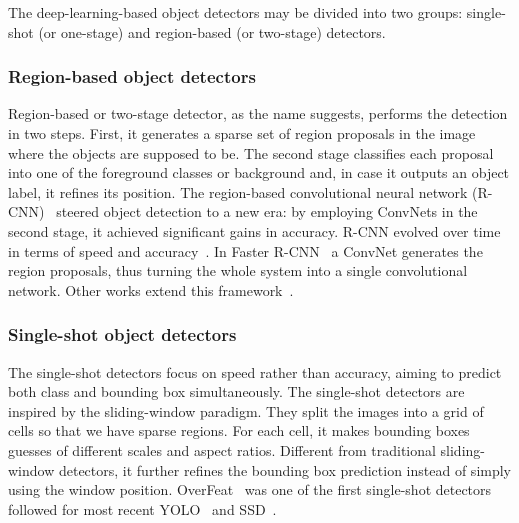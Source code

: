 %
The deep-learning-based object detectors may be divided into two groups: single-shot (or one-stage) and region-based (or two-stage) detectors.

\subsubsection{Region-based object detectors}
%
Region-based or two-stage detector, as the name suggests, performs the detection in two steps.
First, it generates a sparse set of region proposals in the image where the objects are supposed to be.
The second stage classifies each proposal into one of the foreground classes or background and, in case it outputs an object label, it refines its position.
The region-based convolutional neural network (R-CNN)~\cite{Girshick2016RCNN}
steered object detection to a new era:
by employing ConvNets in the second stage, it achieved significant gains in accuracy.
R-CNN evolved over time in terms of speed and accuracy~\cite{Girshick2015, Ren2017fasterpami}.
In Faster R-CNN~\cite{Ren2017fasterpami} a ConvNet generates the region proposals, thus turning the whole system into a single convolutional network.
Other works extend this framework~\cite{Dai2016, He2017mask}.

\subsubsection{Single-shot object detectors}
%
The single-shot detectors focus on speed rather than accuracy,
aiming to predict both class and bounding box simultaneously.
The single-shot detectors are inspired by the sliding-window paradigm.
They split the images into a grid of cells so that we have sparse regions. For each cell, it makes bounding boxes guesses of different scales and aspect ratios.
Different from traditional sliding-window detectors, it further refines the bounding box prediction instead of simply using the window position.
OverFeat~\cite{Sermanet2014} was one of the first single-shot detectors followed for most recent YOLO~\cite{Redmon2016} and SSD~\cite{Liu2016}.


